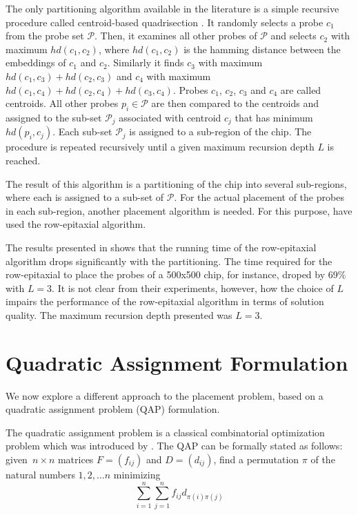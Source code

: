\documentclass{bioinfo}
\begin{document}
The only partitioning algorithm available in the literature is a simple recursive procedure called centroid-based quadrisection \citep{KAHNG03_1}. It randomly selects a probe $c_1$ from the probe set $\mathcal{P}$. Then, it examines all other probes of $\mathcal{P}$ and selects $c_2$ with maximum $hd(c_1,c_2)$, where $hd(c_1,c_2)$ is the hamming distance between the embeddings of $c_1$ and $c_2$. Similarly it finds $c_3$ with maximum $hd(c_1,c_3) + hd(c_2,c_3)$ and $c_4$ with maximum $hd(c_1,c_4) + hd(c_2,c_4) + hd(c_3,c_4)$. Probes $c_1$, $c_2$, $c_3$ and $c_4$ are called centroids. All other probes $p_i \in \mathcal{P}$ are then compared to the centroids and assigned to the sub-set $\mathcal{P}_j$ associated with centroid $c_j$ that has minimum $hd(p_i,c_j)$. Each sub-set $\mathcal{P}_j$ is assigned to a sub-region of the chip. The procedure is repeated recursively until a given maximum recursion depth $L$ is reached.

The result of this algorithm is a partitioning of the chip into several sub-regions, where each is assigned to a sub-set of $\mathcal{P}$. For the actual placement of the probes in each sub-region, another placement algorithm is needed. For this purpose, \citealp{KAHNG03_1} have used the row-epitaxial algorithm.

The results presented in \citealp{KAHNG03_1} shows that the running time of the row-epitaxial algorithm drops significantly with the partitioning. The time required for the row-epitaxial to place the probes of a 500x500 chip, for instance, droped by 69\% with $L = 3$. It is not clear from their experiments, however, how the choice of $L$ impairs the performance of the row-epitaxial algorithm in terms of solution quality. The maximum recursion depth presented was $L = 3$.

\section{Quadratic Assignment Formulation}

We now explore a different approach to the placement problem, based on a quadratic assignment problem (QAP) formulation.

The quadratic assignment problem is a classical combinatorial optimization problem which was introduced by \citealp{KOOPMANS57}. The QAP can be formally stated as follows: given~$n \times n$ matrices $F = (f_{ij})$ and $D = (d_{ij})$, find a permutation $\pi$ of the natural numbers $1, 2, \ldots n$ minimizing
\begin{equation}
\label{eq:qap_def} \sum_{i=1}^{n} \sum_{j=1}^{n} f_{ij} d_{\pi(i)\pi(j)}
\end{equation}
\end{document}
